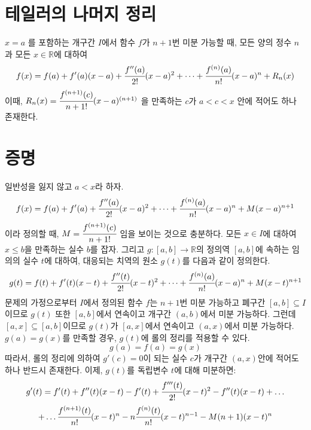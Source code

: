 \documentclass{article}
\begin{document}
\section{테일러의 나머지 정리}
$x=a$ 를 포함하는 개구간 $I$에서 함수 $f$가 $n+1$번 미분 가능할 때, 모든 양의 정수 $n$과 모든 $x \in \mathbb{R}$에 대하여
\begin{equation}
f(x)=f(a)+f'(a)(x-a)+\cfrac{f''(a)}{2!}(x-a)^2+\dots+\cfrac{f^{(n)}(a)}{n!}(x-a)^n+R_n(x)
\end{equation}
이때, $R_n(x)=\cfrac{f^{(n+1)}(c)}{n+1!}(x-a)^{(n+1)}$ 을 만족하는 $c$가 $a<c<x$ 안에 적어도 하나 존재한다.

\section{증명}
일반성을 잃지 않고 $a<x$라 하자.
\begin{equation}
f(x)=f(a)+f'(a)+\cfrac{f''(a)}{2!}(x-a)^2+\dots+\cfrac{f^{(n)}(a)}{n!}(x-a)^n+M(x-a)^{n+1}
\end{equation}
이라 정의할 때, $M=\cfrac{f^{(n+1)}(c)}{n+1!}$ 임을 보이는 것으로 충분하다.\newline
모든 $x \in I$에 대하여 $x\leq b$을 만족하는 실수 $b$를 잡자. 그리고 $g : [a,b] \longrightarrow \mathbb{R}$의 정의역 $[a,b]$에 속하는 임의의 실수 $t$에 대하여, 대응되는 치역의 원소 $g(t)$를 다음과 같이 정의한다.
\begin{equation}
g(t)=f(t)+f'(t)(x-t)+\cfrac{f''(t)}{2!}(x-t)^2+\dots+\cfrac{f^{(n)}(a)}{n!}(x-a)^n+M(x-t)^{n+1}
\end{equation}
문제의 가정으로부터 $I$에서 정의된 함수 $f$는 $n+1$번 미분 가능하고 폐구간 $[a,b]\subseteq I$이므로 $g(t)$ 또한 $[a,b]$에서 연속이고 개구간 $(a,b)$에서 미분 가능하다.\newline
그런데 $[a,x] \subseteq [a,b]$이므로 $g(t)$가 $[a,x]$에서 연속이고 $(a,x)$에서 미분 가능하다. $g(a)=g(x)$를 만족할 경우, $g(t)$에 롤의 정리를 적용할 수 있다. \newline
\begin{equation}
g(a)=f(a)=g(x)
\end{equation}
따라서, 롤의 정리에 의하여 $g'(c)=0$이 되는 실수 $c$가 개구간 $(a,x)$안에 적어도 하나 반드시 존재한다. \newline
이제, $g(t)$를 독립변수 $t$에 대해 미분하면:
\begin{eqnarray}
g'(t)=f'(t)+f''(t)(x-t)-f'(t)+\cfrac{f'''(t)}{2!}(x-t)^2-f''(t)(x-t)+\dots
\end{eqnarray}
\begin{equation}
+\dots \cfrac{f^{(n+1)}(t)}{n!}(x-t)^n-n\cfrac{f^{(n)}(t)}{n!}(x-t)^{n-1}-M(n+1)(x-t)^n
\end{equation}
\end{document}
